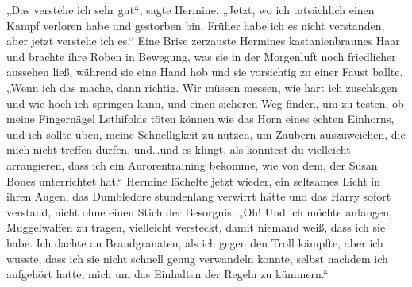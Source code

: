„Das verstehe ich sehr gut“, sagte Hermine. „Jetzt, wo ich tatsächlich einen Kampf verloren habe und gestorben bin. Früher habe ich es nicht verstanden, aber jetzt verstehe ich es.“
Eine Brise zerzauste Hermines kastanienbraunes Haar und brachte ihre Roben in Bewegung, was sie in der Morgenluft noch friedlicher aussehen ließ, während sie eine Hand hob und sie vorsichtig zu einer Faust ballte.
„Wenn ich das mache, dann richtig. Wir müssen messen, wie hart ich zuschlagen und wie hoch ich springen kann, und einen sicheren Weg finden, um zu testen, ob meine Fingernägel Lethifolds töten können wie das Horn eines echten Einhorns, und ich sollte üben, meine Schnelligkeit zu nutzen, um Zaubern auszuweichen, die mich nicht treffen dürfen, und…und es klingt, als könntest du vielleicht arrangieren, dass ich ein Aurorentraining bekomme, wie von dem, der Susan Bones unterrichtet hat.“
Hermine lächelte jetzt wieder, ein seltsames Licht in ihren Augen, das Dumbledore stundenlang verwirrt hätte und das Harry sofort verstand, nicht ohne einen Stich der Besorgnis.
„Oh! Und ich möchte anfangen, Muggelwaffen zu tragen, vielleicht versteckt, damit niemand weiß, dass ich sie habe. Ich dachte an Brandgranaten, als ich gegen den Troll kämpfte, aber ich wusste, dass ich sie nicht schnell genug verwandeln konnte, selbst nachdem ich aufgehört hatte, mich um das Einhalten der Regeln zu kümmern.“

